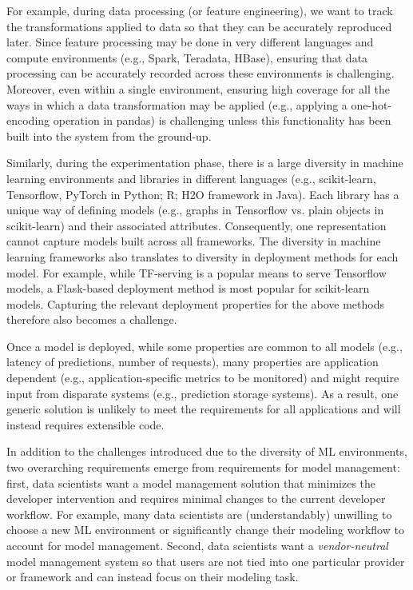 \documentclass[11pt]{article}
\newcommand{\dss}{data scientists\xspace}
\begin{document}
For example, during data processing (or feature engineering), we want to track the
transformations applied to data so that they can be accurately reproduced later.
Since feature processing may be done in very different languages and compute environments (e.g., Spark, Teradata, HBase), ensuring that data processing can be accurately recorded across these environments is challenging.
Moreover, even within a single environment, ensuring high coverage for all the ways in which a data transformation may be applied (e.g., applying a one-hot-encoding operation in pandas) is challenging unless this functionality has been built into the system from the ground-up.

Similarly, during the experimentation phase, there is a large diversity in machine learning environments and libraries in different languages (e.g., scikit-learn, Tensorflow, PyTorch in Python; R; H2O framework in Java).
Each library has a unique way of defining models (e.g., graphs in Tensorflow vs. plain objects in scikit-learn) and their associated attributes.
Consequently, one representation cannot capture models built across all frameworks.
The diversity in machine learning frameworks also translates to diversity in deployment methods for each model.
For example, while TF-serving is a popular means to serve Tensorflow models, a Flask-based deployment method is most popular for scikit-learn models.
Capturing the relevant deployment properties for the above methods therefore also becomes a challenge.

Once a model is deployed, while some properties are common to all models (e.g., latency of predictions, number of requests), many properties are application dependent (e.g., application-specific metrics to be monitored) and might require input from disparate systems (e.g., prediction storage systems).
As a result, one generic solution is unlikely to meet the requirements for all applications and will instead requires extensible code.

In addition to the challenges introduced due to the diversity of ML environments, two overarching requirements emerge from requirements for model management: first, \dss want a model management solution that minimizes the developer intervention and requires minimal changes to the current developer workflow.
For example, many \dss are (understandably) unwilling to choose a new ML environment or significantly change their modeling workflow to account for model management.
Second, \dss want a {\it vendor-neutral} model management system so that users are not tied into one particular provider or framework and can instead focus on their modeling task.
\end{document}
